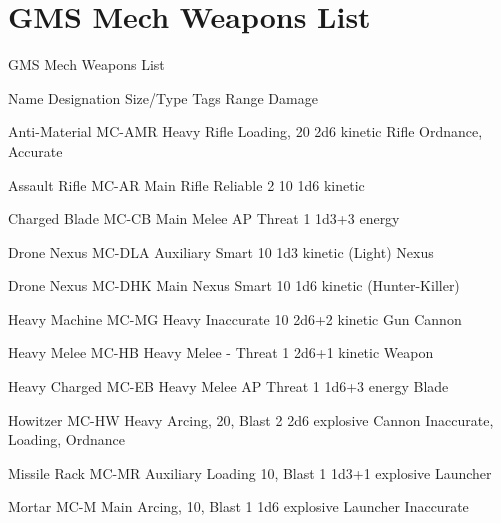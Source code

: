 \section{GMS Mech Weapons List}
                                   GMS Mech Weapons List

Name                 Designation        Size/Type        Tags                Range          Damage

Anti-Material        MC-AMR             Heavy Rifle       Loading,            20            2d6 kinetic
Rifle                                                     Ordnance,
                                                        Accurate

Assault Rifle         MC-AR              Main Rifle        Reliable 2          10             1d6 kinetic

Charged Blade        MC-CB              Main Melee      AP                  Threat 1        1d3+3 energy

Drone Nexus          MC-DLA             Auxiliary        Smart               10             1d3 kinetic
(Light)                                 Nexus

Drone Nexus          MC-DHK             Main Nexus       Smart               10             1d6 kinetic
(Hunter-Killer)

Heavy Machine        MC-MG              Heavy            Inaccurate          10            2d6+2 kinetic
Gun                                     Cannon

Heavy Melee          MC-HB              Heavy Melee      -                  Threat 1       2d6+1 kinetic
Weapon

Heavy Charged        MC-EB              Heavy Melee     AP                  Threat 1        1d6+3 energy
Blade

Howitzer             MC-HW              Heavy           Arcing,              20, Blast 2   2d6 explosive
                                        Cannon           Inaccurate,
                                                         Loading,
                                                         Ordnance

Missile Rack         MC-MR              Auxiliary        Loading             10, Blast 1    1d3+1 explosive
                                        Launcher

Mortar               MC-M               Main            Arcing,              10, Blast 1    1d6 explosive
                                        Launcher         Inaccurate

